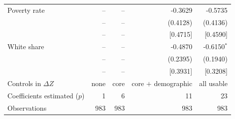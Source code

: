 \begin{tabular}{lrrrr}
Poverty rate & -- & -- & -0.3629 & -0.5735 \\
 & -- & -- & (0.4128) & (0.4136) \\
 & -- & -- & [0.4715] & [0.4590] \\
White share & -- & -- & -0.4870 & -0.6150$^{*}$ \\
 & -- & -- & (0.2395) & (0.1940) \\
 & -- & -- & [0.3931] & [0.3208] \\
\midrule
Controls in $\Delta Z$ & none & core & core $+$ demographic & all usable \\
Coefficients estimated ($p$) & 1 & 6 & 11 & 23 \\
Observations & 983 & 983 & 983 & 983 \\
\bottomrule
\end{tabular}
